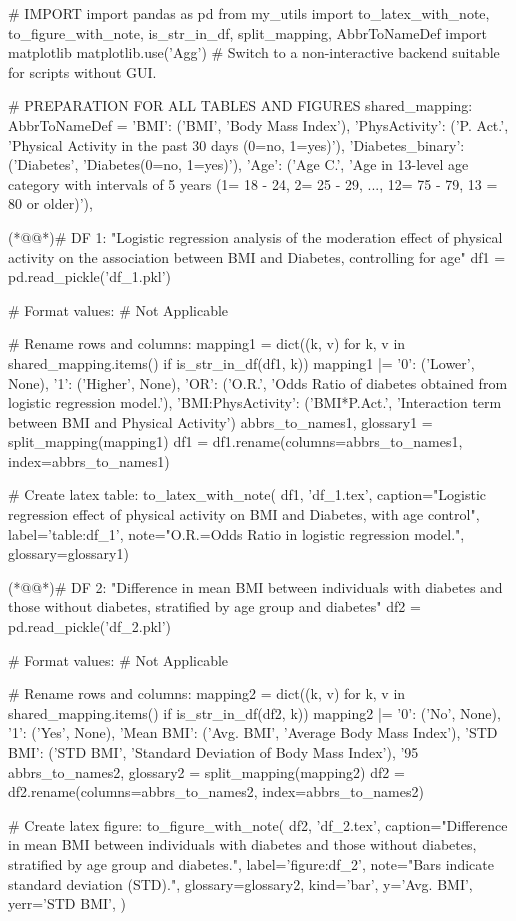 \documentclass[11pt]{article}
\begin{document}
\begin{python}

# IMPORT
import pandas as pd
from my_utils import to_latex_with_note, to_figure_with_note, is_str_in_df, split_mapping, AbbrToNameDef
import matplotlib
matplotlib.use('Agg')  # Switch to a non-interactive backend suitable for scripts without GUI.

# PREPARATION FOR ALL TABLES AND FIGURES
shared_mapping: AbbrToNameDef = {
    'BMI': ('BMI', 'Body Mass Index'),
    'PhysActivity': ('P. Act.', 'Physical Activity in the past 30 days (0=no, 1=yes)'),
    'Diabetes_binary': ('Diabetes', 'Diabetes(0=no, 1=yes)'),
    'Age': ('Age C.', 'Age in 13-level age category with intervals of 5 years (1= 18 - 24, 2= 25 - 29, ..., 12= 75 - 79, 13 = 80 or older)'),
}

(*@@*)# DF 1: "Logistic regression analysis of the moderation effect of physical activity on the association between BMI and Diabetes, controlling for age"
df1 = pd.read_pickle('df_1.pkl')

# Format values:
# Not Applicable

# Rename rows and columns:
mapping1 = dict((k, v) for k, v in shared_mapping.items() if is_str_in_df(df1, k)) 
mapping1 |= {
    '0': ('Lower', None),
    '1': ('Higher', None),
    'OR': ('O.R.', 'Odds Ratio of diabetes obtained from logistic regression model.'),
    'BMI:PhysActivity': ('BMI*P.Act.', 'Interaction term between BMI and Physical Activity')
}
abbrs_to_names1, glossary1 = split_mapping(mapping1)
df1 = df1.rename(columns=abbrs_to_names1, index=abbrs_to_names1)

# Create latex table:
to_latex_with_note(
    df1, 'df_1.tex',
    caption="Logistic regression effect of physical activity on BMI and Diabetes, with age control", 
    label='table:df_1',
    note="O.R.=Odds Ratio in logistic regression model.",
    glossary=glossary1)

(*@@*)# DF 2: "Difference in mean BMI between individuals with diabetes and those without diabetes, stratified by age group and diabetes"
df2 = pd.read_pickle('df_2.pkl')

# Format values:
# Not Applicable

# Rename rows and columns:
mapping2 = dict((k, v) for k, v in shared_mapping.items() if is_str_in_df(df2, k)) 
mapping2 |= {
    '0': ('No', None),
    '1': ('Yes', None),
    'Mean BMI': ('Avg. BMI', 'Average Body Mass Index'),
    'STD BMI': ('STD BMI', 'Standard Deviation of Body Mass Index'),
    '95%
}
abbrs_to_names2, glossary2 = split_mapping(mapping2)
df2 = df2.rename(columns=abbrs_to_names2, index=abbrs_to_names2)

# Create latex figure:
to_figure_with_note(
    df2, 'df_2.tex',
    caption="Difference in mean BMI between individuals with diabetes and those without diabetes, stratified by age group and diabetes.", 
    label='figure:df_2',
    note="Bars indicate standard deviation (STD).",
    glossary=glossary2,
    kind='bar',
    y='Avg. BMI',
    yerr='STD BMI',  
)

\end{python}
\end{document}
